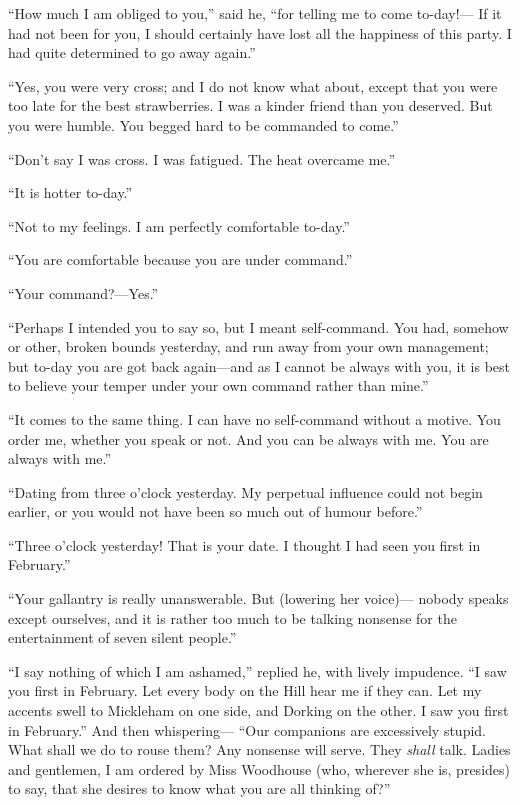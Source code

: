 ``How much I am obliged to you,'' said he, ``for telling me to come to-day!---%
If it had not been for you, I should certainly have lost all the
happiness of this party.  I had quite determined to go away again.''

``Yes, you were very cross; and I do not know what about,
except that you were too late for the best strawberries.
I was a kinder friend than you deserved.  But you were humble.
You begged hard to be commanded to come.''

``Don't say I was cross.  I was fatigued.  The heat overcame me.''

``It is hotter to-day.''

``Not to my feelings.  I am perfectly comfortable to-day.''

``You are comfortable because you are under command.''

``Your command?---Yes.''

``Perhaps I intended you to say so, but I meant self-command. You had,
somehow or other, broken bounds yesterday, and run away from your
own management; but to-day you are got back again---and as I cannot
be always with you, it is best to believe your temper under your
own command rather than mine.''

``It comes to the same thing.  I can have no self-command without
a motive.  You order me, whether you speak or not.  And you can
be always with me.  You are always with me.''

``Dating from three o'clock yesterday.  My perpetual influence
could not begin earlier, or you would not have been so much
out of humour before.''

``Three o'clock yesterday!  That is your date.  I thought I had seen
you first in February.''

``Your gallantry is really unanswerable.  But (lowering her voice)---%
nobody speaks except ourselves, and it is rather too much to be
talking nonsense for the entertainment of seven silent people.''

``I say nothing of which I am ashamed,'' replied he, with lively impudence.
``I saw you first in February.  Let every body on the Hill hear me if
they can.  Let my accents swell to Mickleham on one side, and Dorking
on the other.  I saw you first in February.''  And then whispering---%
``Our companions are excessively stupid.  What shall we do to rouse them?
Any nonsense will serve.  They \emph{shall} talk.  Ladies and gentlemen,
I am ordered by Miss Woodhouse (who, wherever she is, presides)
to say, that she desires to know what you are all thinking of?''

